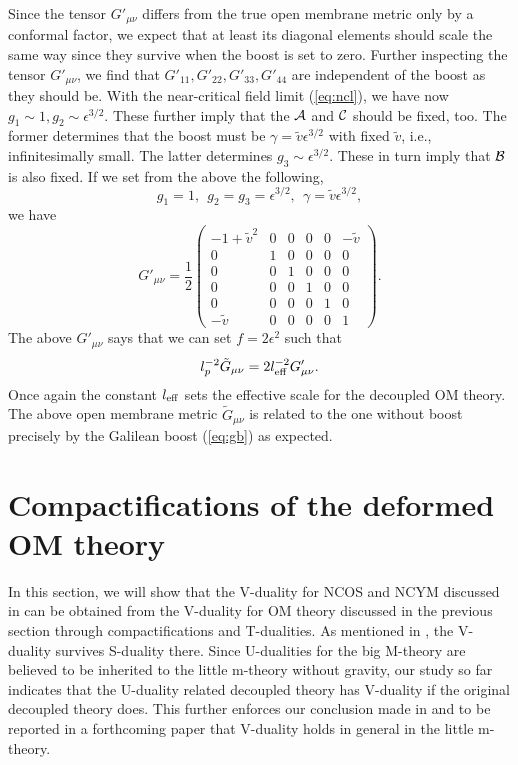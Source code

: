 \documentclass[a4paper,12pt]{article}
\newcommand{\sect}[1]{\setcounter{equation}{0}\section{#1}}
\begin{document}
Since the tensor $G'_{\mu\nu}$ differs from the true open membrane
metric only by a conformal factor, we expect that at least its diagonal 
elements should scale the same way since they survive when the
boost is set to zero. Further inspecting the tensor $G'_{\mu\nu}$, we
find that $G'_{11}, G'_{22}, G'_{33}, G'_{44}$ are independent of the
boost as they should be. With the near-critical field limit
(\ref{eq:ncl}), we have now $g_1 \sim 1, g_2 \sim \epsilon^{3/2}$. These
further imply that the ${\cal A}$ and ${\cal C}$ should be fixed, too.
The former determines that the boost must be $\gamma = \tilde v
\epsilon^{3/2}$ with fixed $\tilde v$, i.e., infinitesimally small. The
latter determines $g_3 \sim \epsilon^{3/2}$. These in turn imply that 
${\cal B}$ is also fixed. If we set from the above the following, 
\begin{equation}
g_1 = 1, \ \ g_2 = g_3 = \epsilon^{3/2}, \ \ \gamma = \tilde v
\epsilon^{3/2},
\end{equation}
we have
\begin{equation}
\label{3eq11}
G'_{\mu\nu}=\frac{1}{2} \left (
\begin{array}{cccccc}
-1 + \tilde{v}^2 &0&0&0&0& -\tilde{v} \\
0&1&0&0&0&0 \\
0&0&1&0&0&0 \\
0&0&0&1&0&0 \\
0&0&0&0&1&0 \\
-\tilde{v} &0&0&0&0& 1
\end{array} \right).
\end{equation}
The above $G'_{\mu\nu}$ says that we can set $f = 2 \epsilon^2$ such
that
\begin{equation}
\label{3eq12}
l_p^{-2} \tilde{G}_{\mu\nu}= 2 l^{-2}_{\rm eff} G'_{\mu\nu}.
\end{equation}
Once again the constant $l_{\rm eff}$ sets the effective scale for 
 the decoupled
OM theory. The above open membrane metric $\tilde G_{\mu\nu}$ is
 related to the one without boost precisely by the Galilean boost
(\ref{eq:gb}) as expected.

\sect{Compactifications of the deformed OM theory}

	In this section, we will show that the V-duality for NCOS and
NCYM discussed in \cite{CW,CLW} can be obtained from the V-duality for OM
theory discussed in the previous section through compactifications and 
T-dualities. As mentioned in \cite{CLW}, the V-duality survives
S-duality there. Since U-dualities for the big M-theory are believed to 
be inherited to the little m-theory without gravity, our study so far
indicates that the U-duality related decoupled theory has V-duality if
the original decoupled theory does. This further enforces our conclusion
made in \cite{CLW} and to be reported in a forthcoming paper
\cite{clwone} that V-duality holds in general in the little
m-theory.
\end{document}
